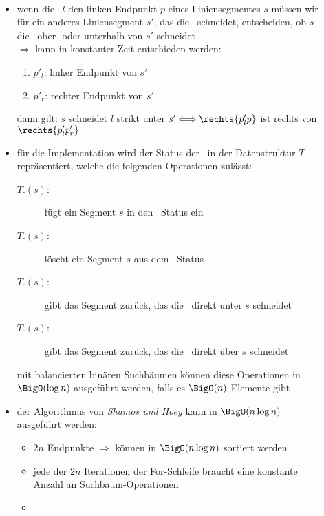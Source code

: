 \begin{description}
	\item[]\ \\\up\up
		\begin{itemize}
			\item wenn die \sweep~$l$ den linken Endpunkt $p$ eines Liniensegmentes $s$ müssen wir für ein anderes Liniensegment $s'$, das die \sweep~schneidet, entscheiden, ob $s$ die \sweep~ober- oder unterhalb von $s'$ schneidet\\
			$\Rightarrow$ kann in konstanter Zeit entschieden werden:
				\begin{enumerate}
					\item $p'_l$: linker Endpunkt von $s'$
					\item $p'_r$: rechter Endpunkt von $s'$
				\end{enumerate}
				dann gilt: $s$ schneidet $l$ strikt unter $s' \Longleftrightarrow \rechts{p'_lp}$ ist rechts von $\rechts{p'_lp'_r}$
			\item für die Implementation wird der Status der \sweep~in der Datenstruktur $T$ repräsentiert, welche die folgenden Operationen zulässt:
				\begin{description}
					\item[$T$.\insert$(s)$:] fügt ein Segment $s$ in den \sweep~Status ein
					\item[$T$.\delete$(s)$:] löscht ein Segment $s$ aus dem \sweep~Status
					\item[$T$.\pred$(s)$:] gibt das Segment zurück, das die \sweep~direkt unter $s$ schneidet
					\item[$T$.\succ$(s)$:] gibt das Segment zurück, das die \sweep~direkt über $s$ schneidet
				\end{description}
			mit balancierten binären Suchbäumen können diese Operationen in $\BigO(\log n)$ ausgeführt werden, falls es $\BigO(n)$ Elemente gibt
			\item der Algorithmus von \textit{Shamos und Hoey} kann in $\BigO(n\log n)$ ausgeführt werden:
				\begin{itemize}
					\item $2n$ Endpunkte $\Rightarrow$ können in $\BigO(n\log n)$ sortiert werden
					\item jede der $2n$ Iterationen der For-Schleife braucht eine konstante Anzahl an Suchbaum-Operationen
					\item {}%
				\end{itemize}
		\end{itemize}

\end{description}

